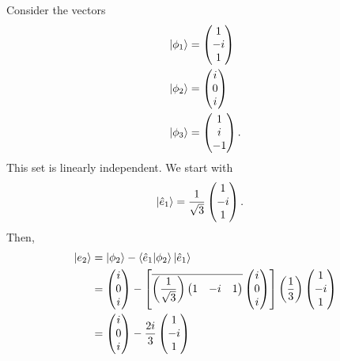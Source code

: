 \documentclass[10pt]{mypackage}
\begin{document}
\begin{example}
  Consider the vectors
  \begin{align*}
    \ket{\phi_1} &= \begin{pmatrix}1\\-i\\1\end{pmatrix}\\
    \ket{\phi_2} &= \begin{pmatrix}i\\0\\i\end{pmatrix}\\
    \ket{\phi_3} &= \begin{pmatrix}1\\i\\-1\end{pmatrix}.
  \end{align*}
 This set is linearly independent. We start with
 \begin{align*}
   \ket{\hat{e}_1} &= \frac{1}{\sqrt{3}} \begin{pmatrix}1\\-i\\1\end{pmatrix}.
 \end{align*}
 Then,
 \begin{align*}
   \ket{e_2} &= \ket{\phi_2} - \braket{\hat{e}_1}{\phi_2}\ket{\hat{e}_1}\\
             &= \begin{pmatrix}i\\0\\i\end{pmatrix} - \left[\overline{\left(\frac{1}{\sqrt{3}}\right) \begin{pmatrix}1 & -i & 1\end{pmatrix} } \begin{pmatrix}i\\0\\i\end{pmatrix}\right] \left(\frac{1}{3}\right) \begin{pmatrix}1\\-i\\1\end{pmatrix}\\
             &= \begin{pmatrix}i\\0\\i\end{pmatrix} - \frac{2i}{3} \begin{pmatrix}1\\-i\\1\end{pmatrix}\\

\end{align*}
\end{example}
\end{document}
